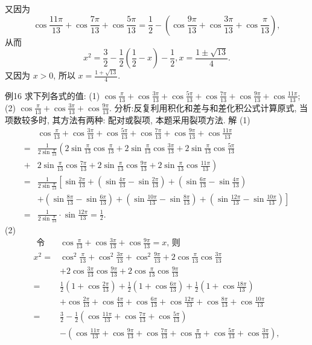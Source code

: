 又因为
$$
\cos \frac{11 \pi}{13}+\cos \frac{7 \pi}{13}+\cos \frac{5 \pi}{13}=\frac{1}{2}-\left(\cos \frac{9 \pi}{13}+\cos \frac{3 \pi}{13}+\cos \frac{\pi}{13}\right),
$$
从而
$$
x^2=\frac{3}{2}-\frac{1}{2}\left(\frac{1}{2}-x\right)-\frac{1}{2}, x=\frac{1 \pm \sqrt{13}}{4} .
$$
又因为 $x>0$, 所以 $x=\frac{1+\sqrt{13}}{4}$.



例16 求下列各式的值:
(1) $\cos \frac{\pi}{13}+\cos \frac{3 \pi}{13}+\cos \frac{5 \pi}{13}+\cos \frac{7 \pi}{13}+\cos \frac{9 \pi}{13}+\cos \frac{11 \pi}{13}$;
(2) $\cos \frac{\pi}{13}+\cos \frac{3 \pi}{13}+\cos \frac{9 \pi}{13}$.
分析:反复利用积化和差与和差化积公式计算原式, 当项数较多时, 其方法有两种: 配对或裂项, 本题采用裂项方法.
解 (1)
$$
\begin{aligned}
& \cos \frac{\pi}{13}+\cos \frac{3 \pi}{13}+\cos \frac{5 \pi}{13}+\cos \frac{7 \pi}{13}+\cos \frac{9 \pi}{13}+\cos \frac{11 \pi}{13} \\
= & \frac{1}{2 \sin \frac{\pi}{13}}\left(2 \sin \frac{\pi}{13} \cos \frac{\pi}{13}+2 \sin \frac{\pi}{13} \cos \frac{3 \pi}{13}+2 \sin \frac{\pi}{13} \cos \frac{5 \pi}{13}\right. \\
+ & \left.2 \sin \frac{\pi}{13} \cos \frac{7 \pi}{13}+2 \sin \frac{\pi}{13} \cos \frac{9 \pi}{13}+2 \sin \frac{\pi}{13} \cos \frac{11 \pi}{13}\right) \\
= & \frac{1}{2 \sin \frac{\pi}{13}}\left[\sin \frac{2 \pi}{13}+\left(\sin \frac{4 \pi}{13}-\sin \frac{2 \pi}{13}\right)+\left(\sin \frac{6 \pi}{13}-\sin \frac{4 \pi}{13}\right)\right. \\
& \left.+\left(\sin \frac{8 \pi}{13}-\sin \frac{6 \pi}{13}\right)+\left(\sin \frac{10 \pi}{13}-\sin \frac{8 \pi}{13}\right) +\left(\sin \frac{12 \pi}{13}-\sin \frac{10 \pi}{13}\right)\right] \\
= & \frac{1}{2 \sin \frac{\pi}{13}} \cdot \sin \frac{12 \pi}{13}=\frac{1}{2} .
\end{aligned}
$$
(2)
$$
\begin{aligned}
\text { 令 } & \cos \frac{\pi}{13}+\cos \frac{3 \pi}{13}+\cos \frac{9 \pi}{13}=x \text {, 则 } \\
x^2= & \cos ^2 \frac{\pi}{13}+\cos ^2 \frac{3 \pi}{13}+\cos ^2 \frac{9 \pi}{13}+2 \cos \frac{\pi}{13} \cos \frac{3 \pi}{13} \\
& +2 \cos \frac{3 \pi}{13} \cos \frac{9 \pi}{13}+2 \cos \frac{\pi}{13} \cos \frac{9 \pi}{13} \\
= & \frac{1}{2}\left(1+\cos \frac{2 \pi}{13}\right)+\frac{1}{2}\left(1+\cos \frac{6 \pi}{13}\right)+\frac{1}{2}\left(1+\cos \frac{18 \pi}{13}\right) \\
& +\cos \frac{2 \pi}{13}+\cos \frac{4 \pi}{13}+\cos \frac{6 \pi}{13}+\cos \frac{12 \pi}{13}+\cos \frac{8 \pi}{13}+\cos \frac{10 \pi}{13} \\
= & \frac{3}{2}-\frac{1}{2}\left(\cos \frac{11 \pi}{13}+\cos \frac{7 \pi}{13}+\cos \frac{5 \pi}{13}\right) \\
& -\left(\cos \frac{11 \pi}{13}+\cos \frac{9 \pi}{13}+\cos \frac{7 \pi}{13}+\cos \frac{\pi}{13}+\cos \frac{5 \pi}{13}+\cos \frac{3 \pi}{13}\right),
\end{aligned}
$$
